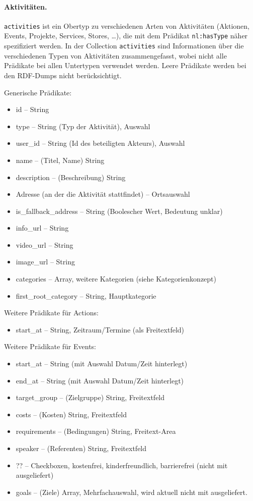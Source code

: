 \documentclass[a4paper,11pt]{article}
\begin{document}
\paragraph{Aktivitäten.}
\texttt{activities} ist ein Obertyp zu verschiedenen Arten von Aktivitäten
(Aktionen, Events, Projekte, Services, Stores, \ldots), die mit dem Prädikat
\texttt{nl:hasType} näher spezifiziert werden.  In der Collection
\texttt{activities} sind Informationen über die verschiedenen Typen von
Aktivitäten zusammengefasst, wobei nicht alle Prädikate bei allen Untertypen
verwendet werden. Leere Prädikate werden bei den RDF-Dumps nicht
berücksichtigt.

Generische Prädikate:
\begin{itemize}
  \item id -- String
  \item type -- String (Typ der Aktivität), Auswahl
  \item user\_id -- String (Id des beteiligten Akteurs), Auswahl
  \item name -- (Titel, Name) String
  \item description -- (Beschreibung) String
  \item Adresse (an der die Aktivität stattfindet) -- Ortsauswahl
  \item is\_fallback\_address -- String (Boolescher Wert, Bedeutung unklar)
  \item info\_url -- String
  \item video\_url -- String
  \item image\_url -- String
  \item categories -- Array, weitere Kategorien (siehe Kategorienkonzept)
  \item first\_root\_category -- String, Hauptkategorie
\end{itemize}

Weitere Prädikate für Actions:
\begin{itemize}
  \item start\_at -- String, Zeitraum/Termine (als Freitextfeld)
\end{itemize}

Weitere Prädikate für Events:
\begin{itemize}
  \item start\_at -- String (mit Auswahl Datum/Zeit hinterlegt)
  \item end\_at -- String (mit Auswahl Datum/Zeit hinterlegt)
  \item target\_group -- (Zielgruppe) String, Freitextfeld
  \item costs -- (Kosten) String, Freitextfeld
  \item requirements -- (Bedingungen) String, Freitext-Area
  \item speaker -- (Referenten) String, Freitextfeld
  \item ?? -- Checkboxen, kostenfrei, kinderfreundlich, barrierefrei (nicht
    mit ausgeliefert) 
  \item goals -- (Ziele) Array, Mehrfachauswahl, wird aktuell nicht mit
    ausgeliefert.
\end{itemize}
\end{document}
